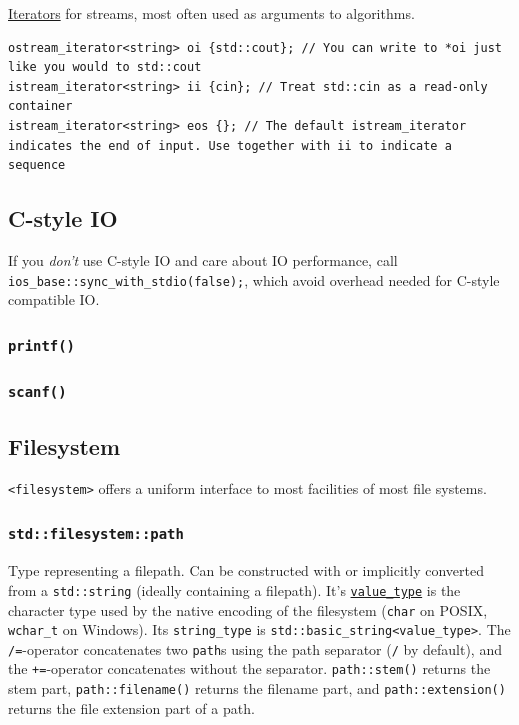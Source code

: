 \documentclass[table, xcdraw]{article}%
\begin{document}
\hyperref[iterators]{Iterators} for streams, most often used as arguments to algorithms.

\begin{verbatim}
ostream_iterator<string> oi {std::cout}; // You can write to *oi just like you would to std::cout
istream_iterator<string> ii {cin}; // Treat std::cin as a read-only container
istream_iterator<string> eos {}; // The default istream_iterator indicates the end of input. Use together with ii to indicate a sequence
\end{verbatim}

\subsection{C-style IO}

If you \textit{don't} use C-style IO and care about IO performance, call \texttt{ios_base::sync_with_stdio(false);}, which avoid overhead needed for C-style compatible IO.

\subsubsection{\texttt{printf()}}

\subsubsection{\texttt{scanf()}}

\subsection{Filesystem}

\texttt{<filesystem>} offers a uniform interface to most facilities of most file systems.

\subsubsection{\texttt{std::filesystem::path}} \label{path}

Type representing a filepath. Can be constructed with or implicitly converted from a \texttt{std::string} (ideally containing a filepath). It's \hyperref[readonlyaccesstotemplatearguments]{\texttt{value_type}} is the character type used by the native encoding of the filesystem (\texttt{char} on POSIX, \texttt{wchar_t} on Windows). Its \texttt{string_type} is \texttt{std::basic_string<value_type>}. The \texttt{/=}-operator concatenates two \texttt{path}s using the path separator (\texttt{/} by default), and the \texttt{+=}-operator concatenates without the separator. \texttt{path::stem()} returns the stem part, \texttt{path::filename()} returns the filename part, and \texttt{path::extension()} returns the file extension part of a path.
\end{document}

